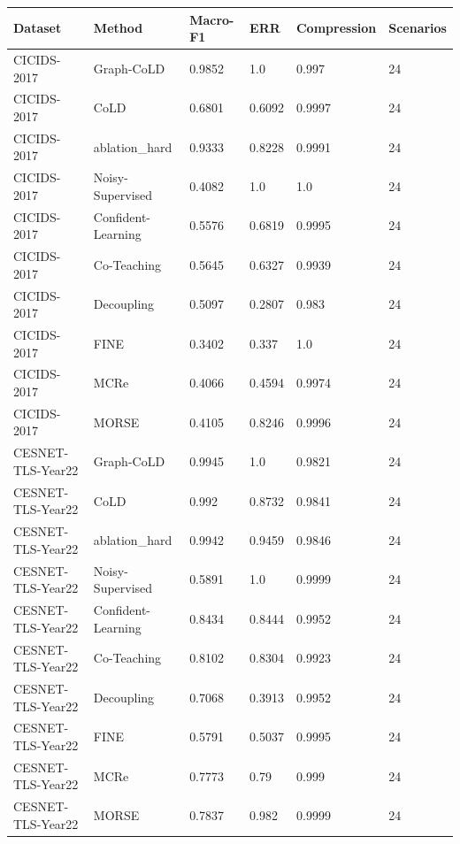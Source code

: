 \small
\begin{tabular}{llllll}
\hline
Dataset & Method & Macro-F1 & ERR & Compression & Scenarios \\
\hline
CICIDS-2017 & Graph-CoLD & 0.9852 & 1.0 & 0.997 & 24 \\
CICIDS-2017 & CoLD & 0.6801 & 0.6092 & 0.9997 & 24 \\
CICIDS-2017 & ablation\_hard & 0.9333 & 0.8228 & 0.9991 & 24 \\
CICIDS-2017 & Noisy-Supervised & 0.4082 & 1.0 & 1.0 & 24 \\
CICIDS-2017 & Confident-Learning & 0.5576 & 0.6819 & 0.9995 & 24 \\
CICIDS-2017 & Co-Teaching & 0.5645 & 0.6327 & 0.9939 & 24 \\
CICIDS-2017 & Decoupling & 0.5097 & 0.2807 & 0.983 & 24 \\
CICIDS-2017 & FINE & 0.3402 & 0.337 & 1.0 & 24 \\
CICIDS-2017 & MCRe & 0.4066 & 0.4594 & 0.9974 & 24 \\
CICIDS-2017 & MORSE & 0.4105 & 0.8246 & 0.9996 & 24 \\
CESNET-TLS-Year22 & Graph-CoLD & 0.9945 & 1.0 & 0.9821 & 24 \\
CESNET-TLS-Year22 & CoLD & 0.992 & 0.8732 & 0.9841 & 24 \\
CESNET-TLS-Year22 & ablation\_hard & 0.9942 & 0.9459 & 0.9846 & 24 \\
CESNET-TLS-Year22 & Noisy-Supervised & 0.5891 & 1.0 & 0.9999 & 24 \\
CESNET-TLS-Year22 & Confident-Learning & 0.8434 & 0.8444 & 0.9952 & 24 \\
CESNET-TLS-Year22 & Co-Teaching & 0.8102 & 0.8304 & 0.9923 & 24 \\
CESNET-TLS-Year22 & Decoupling & 0.7068 & 0.3913 & 0.9952 & 24 \\
CESNET-TLS-Year22 & FINE & 0.5791 & 0.5037 & 0.9995 & 24 \\
CESNET-TLS-Year22 & MCRe & 0.7773 & 0.79 & 0.999 & 24 \\
CESNET-TLS-Year22 & MORSE & 0.7837 & 0.982 & 0.9999 & 24 \\
\hline
\end{tabular}
